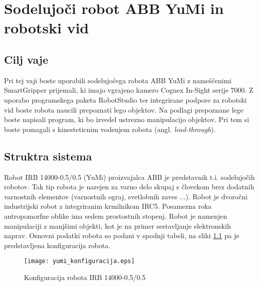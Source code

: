 \chapter{Sodelujoči robot ABB YuMi in robotski vid}%

\begin{mdframed}[backgroundcolor=green!20, shadow=true,roundcorner=8pt]
\vspace{-0.35cm}
\section{Cilj vaje}

Pri tej vaji boste uporabili sodelujočega robota ABB YuMi z nameščenimi SmartGripper prijemali, ki imajo vgrajeno kamero Cognex In-Sight serije 7000. Z uporabo programskega paketa RobotStudio ter integrirane podpore za robotski vid boste robota naucili prepoznati lego objektov. Na podlagi prepoznane lege boste napisali program, ki bo izvedel ustrezno manipulacijo objektov. Pri tem si boste pomagali s kinesteticnim vodenjem robota (angl. \emph{lead-through}).

\end{mdframed}

\section{Struktra sistema}

Robot IRB 14000-0.5/0.5 (YuMi) proizvajalca ABB je predstavnik t.i. sodelujočih robotov. Tak tip robota je narejen za varno delo skupaj s človekom brez dodatnih varnostnih elementov (varnostnih ograj, svetlobnih zaves ...). Robot je dvoročni industrijski robot z integriranim krmilnikom IRC5. Posamezna roka antropomorfne oblike ima sedem prostostnih stopenj. Robot je namenjen manipulaciji z manjšimi objekti, kot je na primer sestavljanje elektronskih naprav. Osnovni podatki robota so podani v spodnji tabeli, na sliki \ref{fig:yumi_conf} pa je predstavljena konfiguracija robota.

\begin{figure}[!hbt]
	\centering
	\texttt{[image: yumi\_konfiguracija.eps]}
	\caption{Konfiguracija robota IRB 14000-0.5/0.5}
	\label{fig:yumi_conf}
\end{figure}


